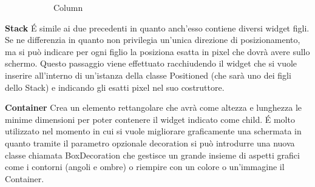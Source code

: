 \begin{trivlist}
\begin{figure}[h!]
\begin{subfigure}{0.3\linewidth}
				\caption{Column}
			\end{subfigure}
			\caption{}
			\label{rowColumn}
		\end{figure} 
		\item \textbf{Stack} \newline
		\'E simile ai due precedenti in quanto anch'esso contiene diversi widget
		figli. Se ne differenzia in quanto non privilegia un'unica direzione di
		posizionamento, ma si può indicare per ogni figlio la posiziona esatta
		in pixel che dovrà avere sullo schermo. Questo passaggio viene
		effettuato racchiudendo il widget che si vuole inserire all'interno di
		un'istanza della classe Positioned (che sarà uno dei figli dello Stack)
		e indicando gli esatti pixel nel suo costruttore. 
		\item \textbf{Container} \newline
		Crea un elemento rettangolare che avrà come altezza e lunghezza le
		minime dimensioni per poter contenere il widget indicato come child. \'E
		molto utilizzato nel momento in cui si vuole migliorare graficamente una
		schermata in quanto tramite il parametro opzionale decoration si può
		introdurre una nuova classe chiamata BoxDecoration che gestisce un
		grande insieme di aspetti grafici come i contorni (angoli e
		ombre) o riempire con un colore o un'immagine il Container.
	\end{trivlist}

